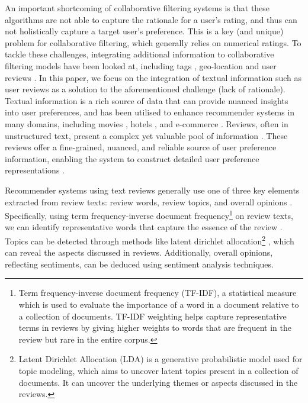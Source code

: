 An important shortcoming of collaborative filtering systems is that these algorithms are not able to capture the rationale for a user’s rating, and thus can not holistically capture a target user’s preference. This is a key (and unique) problem for collaborative filtering, which generally relies on numerical ratings. To tackle these challenges, integrating additional information to collaborative filtering models have been looked at, including tags \cite{zhou2003learning}, geo-location \cite{hu2014your} and user reviews \cite{srifi2020recommender}. In this paper, we focus on the integration of textual information such as user reviews as a solution to the aforementioned challenge (lack of rationale). Textual information is a rich source of data that can provide nuanced insights into user preferences, and has been utilised to enhance recommender systems in many domains, including movies \cite{diao2014jointly}, hotels \cite{musat2013recommendation}, and e-commerce \cite{he2016ups}. Reviews, often in unstructured text, present a complex yet valuable pool of information \cite{shoja2019customer}. These reviews offer a fine-grained, nuanced, and reliable source of user preference information, enabling the system to construct detailed user preference representations \cite{zhang2014urcf}. 

Recommender systems using text reviews generally use one of three  key elements extracted from review texts: review words, review topics, and overall opinions \cite{chen2015augmenting}. Specifically, using term frequency-inverse document frequency\footnote{Term frequency-inverse document frequency (TF-IDF), a statistical measure which is used to evaluate the importance of a word in a document relative to a collection of documents. TF-IDF weighting helps capture representative terms in reviews by giving higher weights to words that are frequent in the review but rare in the entire corpus.} on review texts, we can identify representative words that capture the essence of the review \cite{chen2015augmenting}. Topics can be detected through methods like latent dirichlet allocation\footnote{Latent Dirichlet Allocation (LDA) is a generative probabilistic model used for topic modeling, which aims to uncover latent topics present in a collection of documents. It can uncover the underlying themes or aspects discussed in the reviews.} \cite{chen2015augmenting}, which can reveal the aspects discussed in reviews. Additionally, overall opinions, reflecting sentiments, can be deduced using sentiment analysis techniques. 

